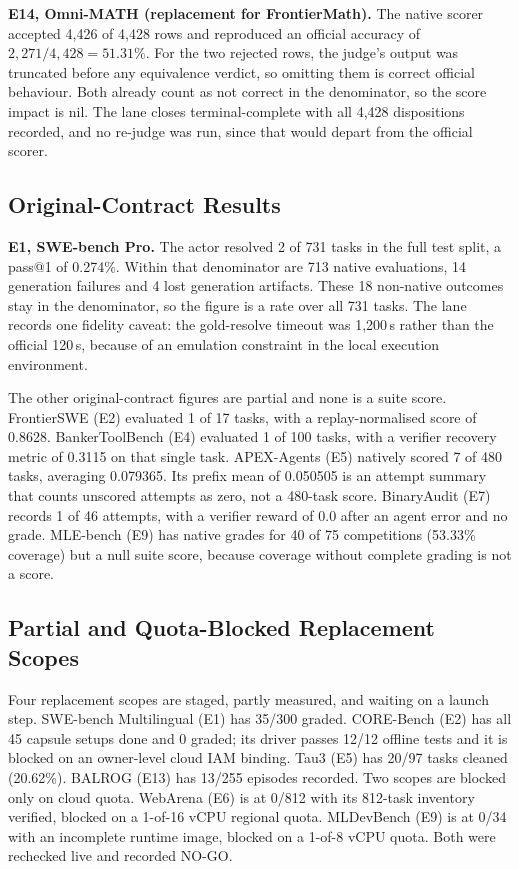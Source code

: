 \documentclass[runningheads]{llncs}
\begin{document}
\textbf{E14, Omni-MATH (replacement for FrontierMath).} The native scorer
accepted 4,426 of 4,428 rows and reproduced an official accuracy of
$2{,}271/4{,}428 = 51.31\%$. For the two rejected rows, the judge's output was
truncated before any equivalence verdict, so omitting them is correct official
behaviour. Both already count as not correct in the denominator, so the score
impact is nil. The lane closes terminal-complete with all 4,428 dispositions
recorded, and no re-judge was run, since that would depart from the official
scorer.

\subsection{Original-Contract Results}

\textbf{E1, SWE-bench Pro.} The actor resolved 2 of 731 tasks in the full test
split, a pass@1 of 0.274\%. Within that denominator are 713 native evaluations,
14 generation failures and 4 lost generation artifacts. These 18 non-native
outcomes stay in the denominator, so the figure is a rate over all 731 tasks.
The lane records one fidelity caveat: the gold-resolve timeout was 1,200\,s
rather than the official 120\,s, because of an emulation constraint in the local
execution environment.

The other original-contract figures are partial and none is a suite score.
FrontierSWE (E2) evaluated 1 of 17 tasks, with a replay-normalised score of
0.8628. BankerToolBench (E4) evaluated 1 of 100 tasks, with a verifier recovery
metric of 0.3115 on that single task. APEX-Agents (E5) natively scored 7 of 480
tasks, averaging 0.079365. Its prefix mean of 0.050505 is an attempt summary
that counts unscored attempts as zero, not a 480-task score. BinaryAudit (E7)
records 1 of 46 attempts, with a verifier reward of 0.0 after an agent error and
no grade. MLE-bench (E9) has native grades for 40 of 75 competitions (53.33\%
coverage) but a null suite score, because coverage without complete grading is
not a score.

\subsection{Partial and Quota-Blocked Replacement Scopes}

Four replacement scopes are staged, partly measured, and waiting on a launch
step. SWE-bench Multilingual (E1) has 35/300 graded. CORE-Bench (E2) has all 45
capsule setups done and 0 graded; its driver passes 12/12 offline tests and it
is blocked on an owner-level cloud IAM binding. Tau3 (E5) has 20/97 tasks
cleaned (20.62\%). BALROG (E13) has 13/255 episodes recorded. Two scopes are
blocked only on cloud quota. WebArena (E6) is at 0/812 with its 812-task
inventory verified, blocked on a 1-of-16 vCPU regional quota. MLDevBench (E9)
is at 0/34 with an incomplete runtime image, blocked on a 1-of-8 vCPU quota.
Both were rechecked live and recorded NO-GO.
\end{document}

